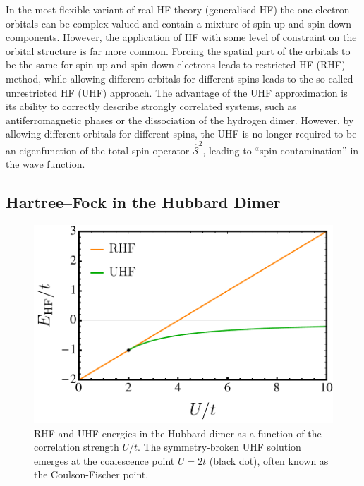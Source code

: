 \documentclass[aps,prb,reprint,noshowkeys,superscriptaddress]{revtex4-1}
\begin{document}
In the most flexible variant of real HF theory (generalised HF) the one-electron orbitals can be complex-valued
and contain a mixture of spin-up and spin-down components.\cite{Mayer_1993,Jimenez-Hoyos_2011}
However, the application of HF with some level of constraint on the orbital structure is far more common.
Forcing the spatial part of the orbitals to be the same for spin-up and spin-down electrons leads to restricted HF (RHF) method, 
while allowing different orbitals for different spins leads to the so-called unrestricted HF (UHF) approach.\cite{StuberPaldus}
The advantage of the UHF approximation is its ability to correctly describe strongly correlated systems, 
such as antiferromagnetic phases\cite{Slater_1951} or the dissociation of the hydrogen dimer.\cite{Coulson_1949}
However, by allowing different orbitals for different spins, the UHF is no longer required to be an eigenfunction of 
the total spin operator $\hat{\mathcal{S}}^2$, leading to ``spin-contamination'' in the wave function.

\subsection{Hartree--Fock in the Hubbard Dimer}
\label{sec:HF_hubbard}

\begin{figure}
    \includegraphics[width=\linewidth]{fig2}
    \caption{\label{fig:HF_real}
    RHF and UHF energies in the Hubbard dimer as a function of the correlation strength $U/t$. 
    The symmetry-broken UHF solution emerges at the coalescence point $U=2t$ (black dot), often known as the Coulson-Fischer point.}
\end{figure}
\end{document}
